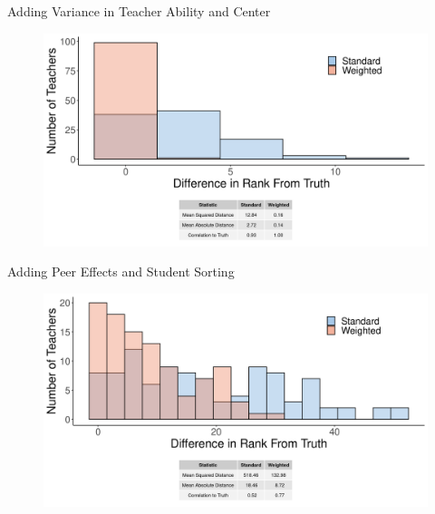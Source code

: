 \documentclass[t,aspectratio=169,11pt]{beamer}
\begin{document}

\begin{frame}{Adding Variance in Teacher Ability and Center}

\hypertarget{hist10}{}
\vfill

\begin{figure}
    \centering
 \includegraphics[width=.75\textwidth]{slides/CIERS_Figures/hist_run_10.png}
\end{figure}

\hyperlink{run4}{}

\end{frame}



\begin{frame}{Adding Peer Effects and Student Sorting}

\hypertarget{bins2}{}
\vfill

\begin{figure}
    \centering
 \includegraphics[width=.75\textwidth]{slides/CIERS_Figures/hist_run_5.png}
\end{figure}

\hyperlink{run6}{}

\end{frame}
\end{document}
